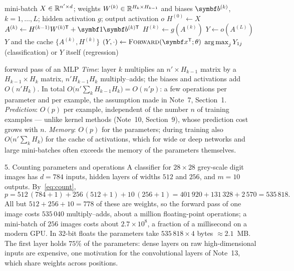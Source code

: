 \documentclass[11pt]{article}
\newcommand{\vb}{\vect{b}}
\begin{document}
\begin{algorithm}[htbp]
\caption{Forward pass and prediction of an $L$-layer MLP on a mini-batch}\label{alg:forward}
\begin{algorithmic}[1]
\Require mini-batch $X \in \mathbb{R}^{n' \times d}$; weights $W^{(k)} \in \mathbb{R}^{H_k \times H_{k-1}}$ and biases $\vb^{(k)}$, $k = 1, \dots, L$; hidden activation $g$; output activation $o$
  \State $H^{(0)} \gets X$
    \State $A^{(k)} \gets H^{(k - 1)}W^{(k)\mathsf{T}} + \vect{1}\vb^{(k)\mathsf{T}}$ 
     \State $H^{(k)} \gets g(A^{(k)})$ 
    \EndIf
  \EndFor
  \State $Y \gets o(A^{(L)})$ 
  \State \Return $Y$ and the cache $\{A^{(k)}, H^{(k)}\}$ 
\EndFunction
{}
  \State $(Y, \cdot) \gets \textsc{Forward}(\x\T; \theta)$ 
  \State \Return $\operatorname*{arg\,max}_j Y_{1j}$ (classification) or $Y$ itself (regression)
\EndFunction
\end{algorithmic}
\end{algorithm}

\begin{runtime}{forward pass of an MLP}
\emph{Time}: layer $k$ multiplies an $n' \times H_{k - 1}$ matrix by a $H_{k - 1} \times H_k$ matrix,
$n'H_{k - 1}H_k$ multiply--adds; the biases and activations add $O(n'H_k)$. In total
$O\big(n'\sum_k H_{k-1}H_k\big) = O(n'p)$: a few operations per parameter and per example, the assumption made
in Note~7, Section~1. \emph{Prediction}: $O(p)$ per example, independent of the number $n$ of training examples ---
unlike kernel methods (Note~10, Section~9), whose prediction cost grows with $n$. \emph{Memory}: $O(p)$ for the
parameters; during training also $O\big(n'\sum_k H_k\big)$ for the cache of activations, which for wide or deep
networks and large mini-batches often exceeds the memory of the parameters themselves.
\end{runtime}

\begin{worked}{5. Counting parameters and operations}
A classifier for $28 \times 28$ grey-scale digit images has $d = 784$ inputs, hidden layers of widths $512$ and $256$, and
$m = 10$ outputs. By~\eqref{eq:count},
\[
  p = 512\,(784 + 1) + 256\,(512 + 1) + 10\,(256 + 1) = 401\,920 + 131\,328 + 2\,570 = 535\,818 .
\]
All but $512 + 256 + 10 = 778$ of these are weights, so the forward pass of one image costs $535\,040$
multiply--adds, about a million floating-point operations; a mini-batch of $256$ images costs about $2.7 \times 10^8$,
a fraction of a millisecond on a modern GPU. In 32-bit floats the parameters take $535\,818 \times 4$ bytes $\approx 2.1$~MB.
The first layer holds $75\%$ of the parameters: dense layers on raw high-dimensional inputs are expensive, one motivation
for the convolutional layers of Note~13, which share weights across positions.
\end{worked}
\end{document}
